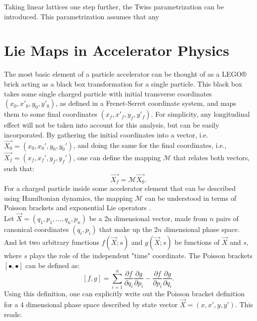 Taking linear lattices one step further, the Twiss parametrization can be introduced. This parametrization assumes that any  

\section{\label{sec:lie}Lie Maps in Accelerator Physics}

The most basic element of a particle accelerator can be thought of as a LEGO® brick acting as a black box transformation for a single particle. This black box takes some single charged particle with initial transverse coordinates $\left( x_0,x'_0,y_0,y'_0 \right)$, as defined in a Frenet-Serret coordinate system, and maps them to some final coordinates $\left( x_f,x'_f,y_f,y'_f \right)$. For simplicity, any longitudinal effect will not be taken into account for this analysis, but can be easily incorporated. By gathering the initial coordinates into a vector, i.e. $\vec{X_0} = \left( x_0,x_0',y_0,y_0' \right)$, and doing the same for the final coordinates, i.e., $\vec{X_f} = \left( x_f,x_f',y_f,y_f' \right)$, one can define the mapping $\mathcal{M}$ that relates both vectors, such that:  
\begin{equation}
\label{eq:ch2map}
\vec{X_f}=\mathcal{M}\vec{X_0}.
\end{equation}
For a charged particle inside some accelerator element that can be described using Hamiltonian dynamics, the mapping $\mathcal{M}$ can be understood in terms of Poisson brackets and exponential Lie operators \cite{wolski,todd1,cernthesis1,cernthesis2,forest}.\\
Let $\vec{X} = \left( q_1,p_1,\dots,q_{n},p_{n} \right)$ be a 2n dimensional vector, made from $n$ pairs of canonical coordinates $(q_i,p_i)$ that make up the 2$n$ dimensional phase space. And let two arbitrary functions $f\left( \vec{X};s\right)$ and $g\left( \vec{X};s\right)$ be functions of $\vec{X}$ and $s$, where $s$ plays the role of the independent "time" coordinate. The Poisson brackets $\left[ \bullet , \bullet \right]$ can be defined as:
\begin{equation}
    \label{eq:ch2poisson}
    \left[ f,g \right] = \sum_{i=1}^{n} \frac{\partial f}{\partial q_i}\frac{\partial g}{\partial p_i} - \frac{\partial f}{\partial p_i}\frac{\partial g}{\partial q_i}. 
\end{equation}
Using this definition, one can explicitly write out the Poisson bracket definition for a 4 dimensional phase space described by state vector $\vec{X} = \left( x,x',y,y' \right)$. This reads: 
